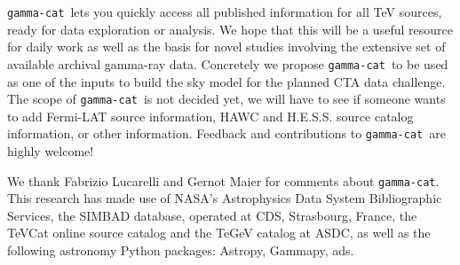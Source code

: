 \documentclass[11pt,twoside]{article}
\newcommand{\gammacat}{\texttt{gamma-cat}}
\begin{document}
\gammacat\ lets you quickly access all published information for all TeV
sources, ready for data exploration or analysis. We hope that this will be a
useful resource for daily work as well as the basis for novel studies involving
the extensive set of available archival gamma-ray data. Concretely we propose
\gammacat\ to be used as one of the inputs to build the sky model for the
planned CTA data challenge. The scope of \gammacat\ is not decided yet, we will
have to see if someone wants to add Fermi-LAT source information, HAWC and
H.E.S.S. source catalog information, or other information. Feedback and
contributions to \gammacat\ are highly welcome!


\acknowledgements We thank Fabrizio Lucarelli and Gernot Maier for comments
about \gammacat. This research has made use of NASA's Astrophysics Data System
Bibliographic Services, the SIMBAD database, operated at CDS, Strasbourg,
France, the TeVCat online source catalog and the TeGeV catalog at ASDC, as well
as the following astronomy Python packages: Astropy, Gammapy, ads.


\end{document}
